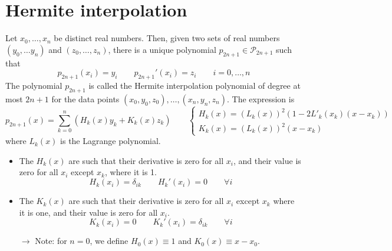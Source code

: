 \documentclass[12pt, openany]{report}
\theoremstyle{definition}
\begin{document}
\section{Hermite interpolation}
Let \(x_0,\dots,x_n\) be distinct real numbers. Then, given two sets of real numbers \((y_0,\dots y_n)\) and \((z_0,\dots,z_n)\), there is a unique polynomial \(p_{2n+1}\in \mathcal{P}_{2n+1}\) such that 
\begin{equation}
    p_{2n+1} (x_i) = y_i \qquad p_{2n+1}'(x_i) =z_i \qquad i=0,\dots,n
\end{equation}
The polynomial \(p_{2n+1}\) is called the Hermite interpolation polynomial of degree at most \(2n+1\) for the data points \((x_0,y_0,z_0),\dots,(x_n,y_n,z_n)\). The expression is 
\begin{equation}
    p_{2n+1}(x) = \sum_{k=0}^n \left(H_k(x)y_k + K_k(x)z_k\right) \qquad \begin{cases}
        H_k(x) = (L_k(x))^2(1-2L'_k(x_k)(x-x_k))\\
        K_k(x) = (L_k(x))^2(x-x_k)
    \end{cases}
\end{equation}
where \(L_k(x)\) is the Lagrange polynomial.
\begin{itemize}
    \item The \(H_k(x)\) are such that their derivative is zero for all \(x_i\), and their value is zero for all \(x_i\) except \(x_k\), where it is 1.\[H_k(x_i) = \delta_{ik}\qquad H_k'(x_i) = 0 \qquad \forall i\]
    \item The \(K_k(x)\) are such that their derivative is zero for all \(x_i\) except \(x_k\) where it is one, and their value is zero for all \(x_i\).\[K_k(x_i) = 0\qquad K_k'(x_i) = \delta_{ik} \qquad \forall i\]
    \item [$\rightarrow$] Note: for $n=0$, we define $H_0(x)\equiv 1$ and $K_0(x)\equiv x-x_0$.
\end{itemize}
\end{document}
